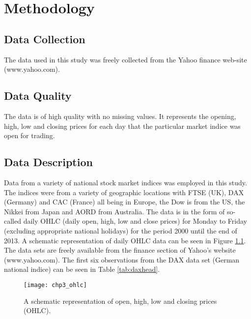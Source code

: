 
\chapter{Methodology} %

\label{Chapter3} %


\section{Data Collection}
The data used in this study was freely collected from the Yahoo finance web-site (www.yahoo.com).

\section{Data Quality}
The data is of high quality with no missing values. It represents the opening, high, low and closing prices for each day that the particular market indice was open for trading. 

\section{Data Description}
Data from a variety of national stock market indices was employed in this study. The indices were from a variety of geographic locations with FTSE (UK), DAX (Germany) and CAC (France) all being in Europe, the Dow is from the US, the Nikkei from Japan and AORD from Australia. The data is in the form of so-called daily OHLC (daily open, high, low and close prices) for Monday to Friday (excluding appropriate national holidays) for the period 2000 until the end of 2013. A schematic representation of daily OHLC data can be seen in Figure \ref{fig:chp3_ohlc}. The data sets are freely available from the finance section of Yahoo's website (www.yahoo.com). The first six observations from the DAX data set (German national indice) can be seen in Table \ref{tab:daxhead}.

\begin{figure}[tbh]
\centering
\texttt{[image: chp3\_ohlc]}
\caption[Open, high, low and closing prices (OHLC).]{A schematic representation of open, high, low and closing prices (OHLC).}
\label{fig:chp3_ohlc}
\end{figure}

